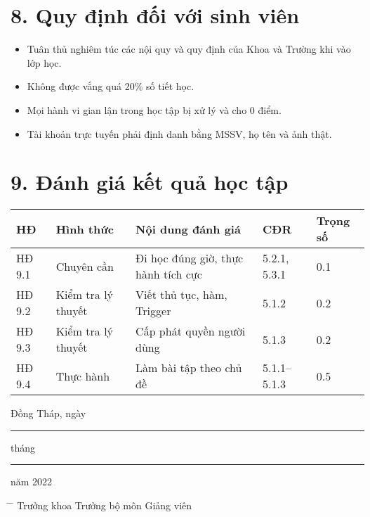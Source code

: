 \documentclass[a4paper,12pt]{article}
\begin{document}
\section*{8. Quy định đối với sinh viên}
\begin{itemize}
    \item Tuân thủ nghiêm túc các nội quy và quy định của Khoa và Trường khi vào lớp học.
    \item Không được vắng quá 20\% số tiết học.
    \item Mọi hành vi gian lận trong học tập bị xử lý và cho 0 điểm.
    \item Tài khoản trực tuyến phải định danh bằng MSSV, họ tên và ảnh thật.
\end{itemize}

\section*{9. Đánh giá kết quả học tập}
\begin{longtable}{|p{2cm}|p{3cm}|p{5cm}|p{2cm}|p{1.5cm}|}
\hline
\textbf{HĐ} & \textbf{Hình thức} & \textbf{Nội dung đánh giá} & \textbf{CĐR} & \textbf{Trọng số} \\
\hline
HĐ 9.1 & Chuyên cần & Đi học đúng giờ, thực hành tích cực & 5.2.1, 5.3.1 & 0.1 \\
\hline
HĐ 9.2 & Kiểm tra lý thuyết & Viết thủ tục, hàm, Trigger & 5.1.2 & 0.2 \\
\hline
HĐ 9.3 & Kiểm tra lý thuyết & Cấp phát quyền người dùng & 5.1.3 & 0.2 \\
\hline
HĐ 9.4 & Thực hành & Làm bài tập theo chủ đề & 5.1.1–5.1.3 & 0.5 \\
\hline
\end{longtable}

\vspace{2em}
\noindent Đồng Tháp, ngày \rule{2cm}{0.2pt} tháng \rule{2cm}{0.2pt} năm 2022

\vspace{2em}
\begin{tabbing}
\hspace{6cm} \= \hspace{6cm} \= \kill
Trưởng khoa \> Trưởng bộ môn \> Giảng viên
\end{tabbing}
\end{document}
